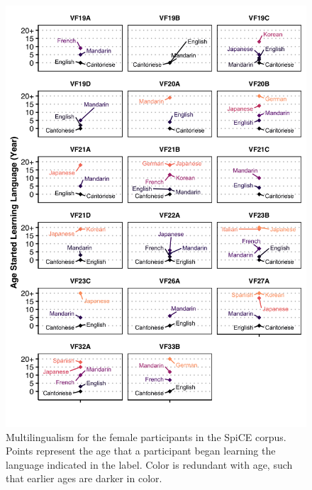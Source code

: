\begin{figure}[!htbp]
  \begin{center}
  \includegraphics[width=4.5in]{figures/ch2_multilingualism_vf_5in.png} 
  \caption{Multilingualism for the female participants in the SpiCE corpus. Points represent the age that a participant began learning the language indicated in the label. Color is redundant with age, such that earlier ages are darker in color.}
  \label{ch2:fig:multilingualism_vf}
  \end{center}
\end{figure}

